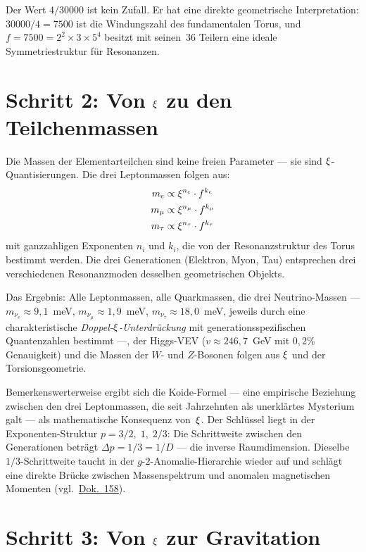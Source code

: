 Der Wert $4/30000$ ist kein Zufall. Er hat eine direkte geometrische Interpretation: $30000/4 = 7500$ ist die Windungszahl des fundamentalen Torus, und $f = 7500 = 2^2 \times 3 \times 5^4$ besitzt mit seinen~36 Teilern eine ideale Symmetriestruktur für Resonanzen.

\section{Schritt 2: Von $\xi$ zu den Teilchenmassen}

Die Massen der Elementarteilchen sind keine freien Parameter --- sie sind $\xi$-Quantisierungen. Die drei Leptonmassen folgen aus:
\begin{align}
m_e &\propto \xi^{n_e} \cdot f^{k_e} \\
m_\mu &\propto \xi^{n_\mu} \cdot f^{k_\mu} \\
m_\tau &\propto \xi^{n_\tau} \cdot f^{k_\tau}
\end{align}
mit ganzzahligen Exponenten $n_i$ und $k_i$, die von der Resonanzstruktur des Torus bestimmt werden. Die drei Generationen (Elektron, Myon, Tau) entsprechen drei verschiedenen Resonanzmoden desselben geometrischen Objekts.

Das Ergebnis: Alle Leptonmassen, alle Quarkmassen, die drei Neutrino-Massen --- $m_{\nu_e} \approx 9{,}1$~meV, $m_{\nu_\mu} \approx 1{,}9$~meV, $m_{\nu_\tau} \approx 18{,}0$~meV, jeweils durch eine charakteristische \emph{Doppel-$\xi$-Unterdrückung} mit generationsspezifischen Quantenzahlen bestimmt ---, der Higgs-VEV ($v \approx 246{,}7$~GeV mit $0{,}2\%$ Genauigkeit) und die Massen der $W$- und $Z$-Bosonen folgen aus $\xi$ und der Torsionsgeometrie.

Bemerkenswerterweise ergibt sich die Koide-Formel --- eine empirische Beziehung zwischen den drei Leptonmassen, die seit Jahrzehnten als unerklärtes Mysterium galt --- als mathematische Konsequenz von~$\xi$. Der Schlüssel liegt in der Exponenten-Struktur $p = 3/2,\; 1,\; 2/3$: Die Schrittweite zwischen den Generationen beträgt $\Delta p = 1/3 = 1/D$ --- die inverse Raumdimension. Dieselbe $1/3$-Schrittweite taucht in der $g$-$2$-Anomalie-Hierarchie wieder auf und schlägt eine direkte Brücke zwischen Massenspektrum und anomalen magnetischen Momenten (vgl.\ \href{https://github.com/jpascher/T0-Time-Mass-Duality/blob/main/2/pdf/158_T0_Koide-zu-g2-1_De.pdf}{Dok.~158}).

\section{Schritt 3: Von $\xi$ zur Gravitation}

